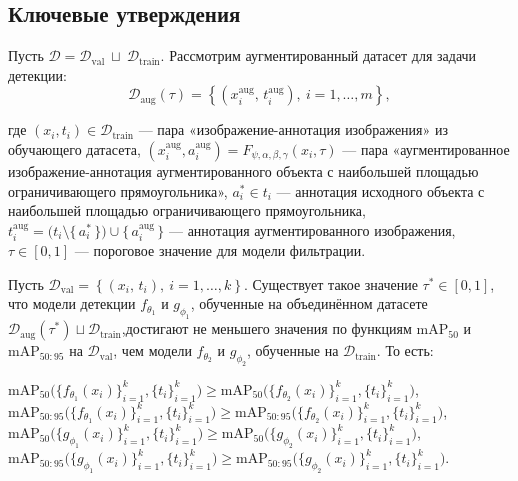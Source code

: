 \subsection{Ключевые утверждения}
Пусть $\mathcal{D} = \mathcal{D}_{\text{val}} \ \sqcup \ \mathcal{D}_{\text{train}}$. Рассмотрим аугментированный датасет для задачи детекции:
\[
\mathcal{D}_{\text{aug}}(\tau) =
\left\{
  (x_i^{\text{aug}},\,t_i^{\text{aug}}), \
  i = 1,\dots,m
\right\},
\]

где $(x_i, t_i) \in \mathcal{D}_{\mathrm{train}}$ — пара «изображение-аннотация изображения» из обучающего датасета,
$(x_i^{\mathrm{aug}}, a_i^{\mathrm{aug}}) = F_{\psi,\alpha,\beta,\gamma}(x_i, \tau)$ — пара «аугментированное изображение-аннотация аугментированного объекта с наибольшей площадью ограничивающего прямоугольника»,
$a_i^* \in t_i$ — аннотация исходного объекта с наибольшей площадью ограничивающего прямоугольника,
$t_i^{\mathrm{aug}} = \bigl(t_i \setminus \{\,a_i^*\,\}\bigr) \cup \{\,a_i^{\mathrm{aug}}\,\}$ — аннотация аугментированного изображения,
$\tau \in [0,1]$ — пороговое значение для модели фильтрации.

\begin{statement1}
Пусть $\mathcal{D}_{\text{val}} =
\left\{
  (x_i,\,t_i), \
  i = 1,\dots,k
\right\}$. Существует такое значение $\tau^*\in[0,1]$, что модели детекции $f_{\theta_1}$ и $g_{\phi_1}$, обученные на объединённом датасете $\mathcal{D}_{\mathrm{aug}}(\tau^*)\sqcup\mathcal{D}_{\mathrm{train}}$,достигают не меньшего значения по функциям $\mathrm{mAP}_{50}$ и $\mathrm{mAP}_{50:95}$ на $\mathcal{D}_{\text{val}}$, чем модели $f_{\theta_2}$ и $g_{\phi_2}$, обученные на $\mathcal{D}_{\text{train}}$. То есть:
\begin{center}
$\mathrm{mAP}_{50}\bigl(\{f_{\theta_1}(x_i)\}_{i=1}^k,\{t_i\}_{i=1}^k\bigr)\ge\mathrm{mAP}_{50}\bigl(\{f_{\theta_2}(x_i)\}_{i=1}^k,\{t_i\}_{i=1}^k\bigr)$,  
$\mathrm{mAP}_{50:95}\bigl(\{f_{\theta_1}(x_i)\}_{i=1}^k,\{t_i\}_{i=1}^k\bigr)\ge\mathrm{mAP}_{50:95}\bigl(\{f_{\theta_2}(x_i)\}_{i=1}^k,\{t_i\}_{i=1}^k\bigr)$,  
$\mathrm{mAP}_{50}\bigl(\{g_{\phi_1}(x_i)\}_{i=1}^k,\{t_i\}_{i=1}^k\bigr)\ge\mathrm{mAP}_{50}\bigl(\{g_{\phi_2}(x_i)\}_{i=1}^k,\{t_i\}_{i=1}^k\bigr)$,  
$\mathrm{mAP}_{50:95}\bigl(\{g_{\phi_1}(x_i)\}_{i=1}^k,\{t_i\}_{i=1}^k\bigr)\ge\mathrm{mAP}_{50:95}\bigl(\{g_{\phi_2}(x_i)\}_{i=1}^k,\{t_i\}_{i=1}^k\bigr)$.
\end{center}
\
\end{statement1}



